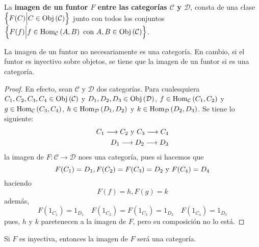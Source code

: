 \documentclass[12pt]{report}
\theoremstyle{largebreak}
\newcommand\cf[3]{\ensuremath{#1:#2\rightarrow#3}}
\newcommand{\Obj}[1]{\ensuremath{\textup{Obj}\left(#1\right)}}
\newcommand{\Hom}[3]{\ensuremath{\textup{Hom}_{#1}\left(#2,#3\right)}}
\begin{document}
    \begin{mydef}
        La \textbf{imagen de un funtor $F$ entre las categorías $\mathcal{C}$ y $\mathcal{D}$}, consta de una clase $\left\{F(C)\Big|C\in\Obj{\mathcal{C}} \right\}$ junto con todos los conjuntos $\left\{F(f)\Big|f\in\Hom{\mathcal{C}}{A}{B}\textup{ con }A,B\in\Obj{\mathcal{C}} \right\}$.
    \end{mydef}

    \begin{obs}
        La imagen de un funtor no necesariamente es una categoría. En cambio, si el funtor es inyectivo sobre objetos, se tiene que la imagen de un funtor si es una categoría.
    \end{obs}

    \begin{proof}
        En efecto, sean $\mathcal{C}$ y $\mathcal{D}$ dos categorías. Para cualesquiera $C_1,C_2,C_3,C_4\in\Obj{\mathcal{C}}$ y $D_1,D_2,D_3\in\Obj{\mathcal{D}}$, $f\in\Hom{\mathcal{C}}{C_1}{C_2}$ y $g\in\Hom{\mathcal{C}}{C_3}{C_4}$, $h\in\Hom{\mathcal{D}}{D_1}{D_2}$ y $k\in\Hom{\mathcal{D}}{D_2}{D_3}$. Se tiene lo siguiente:
        \begin{equation*}
            \begin{split}
                C_1\longrightarrow C_2\textup{ y }C_3\longrightarrow C_4\\
                D_1\longrightarrow D_2\longrightarrow D_3\\
            \end{split}
        \end{equation*}
        la imagen de $\cf{F}{\mathcal{C}}{\mathcal{D}}$ noes una categoría, pues si hacemos que
        \begin{equation*}
            F(C_1)=D_1, F(C_2)=F(C_3)=D_2\textup{ y }F(C_4)=D_4
        \end{equation*}
        haciendo
        \begin{equation*}
            F(f)=h,F(g)=k
        \end{equation*}
        además,
        \begin{equation*}
            F(1_{C_1})=1_{D_1}\quad F(1_{C_2})=F(1_{C_3})=1_{D_2}\quad F(1_{C_4})=1_{D_3} 
        \end{equation*}
        pues, $h$ y $k$ paretenecen a la imagen de $F$, pero su composición no lo está.
    \end{proof}

    \begin{obs}
        Si $F$ es inyectiva, entonces la imagen de $F$ será una categoría.
    \end{obs}
\end{document}
